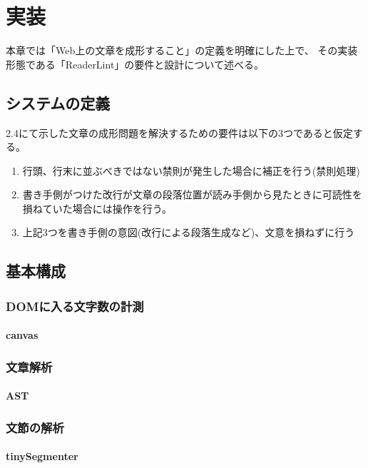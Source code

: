 \chapter{実装}
\label{chap:system}

本章では「Web上の文章を成形すること」の定義を明確にした上で、
その実装形態である「ReaderLint」の要件と設計について述べる。

\section{システムの定義}

2.4にて示した文章の成形問題を解決するための要件は以下の3つであると仮定する。
  
\begin{enumerate}
	\item 行頭、行末に並ぶべきではない禁則が発生した場合に補正を行う(禁則処理)
	\item 書き手側がつけた改行が文章の段落位置が読み手側から見たときに可読性を損ねていた場合には操作を行う。
	\item 上記3つを書き手側の意図(改行による段落生成など)、文意を損ねずに行う
\end{enumerate}


\section{基本構成}

\subsection{DOMに入る文字数の計測}
\subsubsection{canvas} 
\subsection{文章解析}
\subsubsection{AST}
\subsection{文節の解析}
\subsubsection{tinySegmenter}
  
